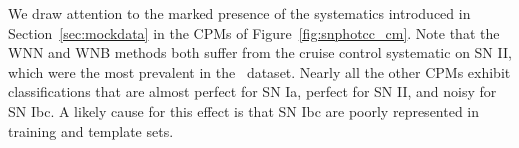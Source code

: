 We draw attention to the marked presence of the systematics introduced in Section~\ref{sec:mockdata} in the CPMs of Figure~\ref{fig:snphotcc_cm}.
Note that the WNN and WNB methods both suffer from the cruise control systematic on SN II, which were the most prevalent in the \snphotcc\ dataset.
Nearly all the other CPMs exhibit classifications that are almost perfect for SN Ia, perfect for SN II, and noisy for SN Ibc.
A likely cause for this effect is that SN Ibc are poorly represented in training and template sets.
%
